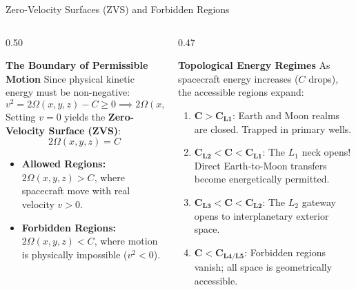 \documentclass[aspectratio=169, 10pt]{beamer}
\begin{document}
\begin{frame}{Zero-Velocity Surfaces (ZVS) and Forbidden Regions}
    \begin{columns}[t]
        \begin{column}{0.50\textwidth}
            \begin{block}{\textbf{The Boundary of Permissible Motion}}
                \scriptsize
                Since physical kinetic energy must be non-negative:
                \begin{equation*}
                    v^2 = 2\Omega(x,y,z) - C \ge 0 \implies 2\Omega(x,y,z) \ge C
                \end{equation*}
                Setting $v = 0$ yields the \textbf{Zero-Velocity Surface (ZVS)}:
                \begin{equation*}
                    2\Omega(x,y,z) = C
                \end{equation*}
                \begin{itemize}\setlength{\itemsep}{2pt}
                    \item \textbf{Allowed Regions:} $2\Omega(x,y,z) > C$, where spacecraft move with real velocity $v > 0$.
                    \item \textbf{Forbidden Regions:} $2\Omega(x,y,z) < C$, where motion is physically impossible ($v^2 < 0$).
                \end{itemize}
            \end{block}
        \end{column}
        
        \begin{column}{0.47\textwidth}
            \begin{block}{\textbf{Topological Energy Regimes}}
                \scriptsize
                As spacecraft energy increases ($C$ drops), the accessible regions expand:
                \begin{enumerate}\setlength{\itemsep}{2pt}
                    \item $\mathbf{C > C_{L1}}$: Earth and Moon realms are closed. Trapped in primary wells.
                    \item $\mathbf{C_{L2} < C < C_{L1}}$: The $L_1$ neck opens! Direct Earth-to-Moon transfers become energetically permitted.
                    \item $\mathbf{C_{L3} < C < C_{L2}}$: The $L_2$ gateway opens to interplanetary exterior space.
                    \item $\mathbf{C < C_{L4/L5}}$: Forbidden regions vanish; all space is geometrically accessible.
                \end{enumerate}
            \end{block}
        \end{column}
    \end{columns}
\end{frame}
\end{document}
